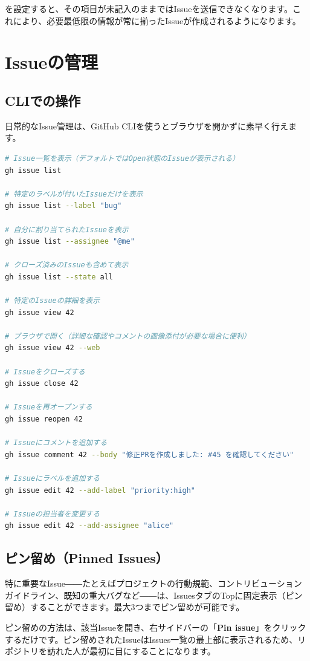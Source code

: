  を設定すると、その項目が未記入のままではIssueを送信できなくなります。これにより、必要最低限の情報が常に揃ったIssueが作成されるようになります。

\section{Issueの管理}

\subsection{CLIでの操作}

日常的なIssue管理は、GitHub CLIを使うとブラウザを開かずに素早く行えます。

\begin{lstlisting}[language=bash]
# Issue一覧を表示（デフォルトではOpen状態のIssueが表示される）
gh issue list

# 特定のラベルが付いたIssueだけを表示
gh issue list --label "bug"

# 自分に割り当てられたIssueを表示
gh issue list --assignee "@me"

# クローズ済みのIssueも含めて表示
gh issue list --state all

# 特定のIssueの詳細を表示
gh issue view 42

# ブラウザで開く（詳細な確認やコメントの画像添付が必要な場合に便利）
gh issue view 42 --web

# Issueをクローズする
gh issue close 42

# Issueを再オープンする
gh issue reopen 42

# Issueにコメントを追加する
gh issue comment 42 --body "修正PRを作成しました: #45 を確認してください"

# Issueにラベルを追加する
gh issue edit 42 --add-label "priority:high"

# Issueの担当者を変更する
gh issue edit 42 --add-assignee "alice"
\end{lstlisting}

\subsection{ピン留め（Pinned Issues）}

特に重要なIssue――たとえばプロジェクトの行動規範、コントリビューションガイドライン、既知の重大バグなど――は、IssuesタブのTopに固定表示（ピン留め）することができます。最大3つまでピン留めが可能です。

ピン留めの方法は、該当Issueを開き、右サイドバーの「\textbf{Pin issue}」をクリックするだけです。ピン留めされたIssueはIssues一覧の最上部に表示されるため、リポジトリを訪れた人が最初に目にすることになります。

